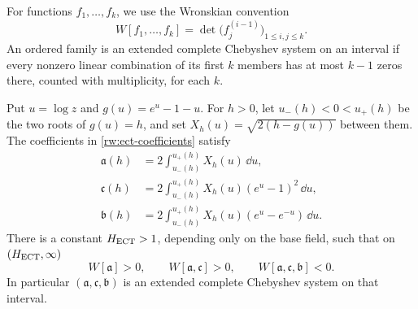 For functions $f_1,\ldots,f_k$, we use the Wronskian convention
\[
 W[f_1,\ldots,f_k]
   =\det\bigl(f_j^{(i-1)}\bigr)_{1\leq i,j\leq k}.
\]
An ordered family is an extended complete Chebyshev system on an
interval if every nonzero linear combination of its first $k$
members has at most $k-1$ zeros there, counted with multiplicity,
for each $k$.

\begin{proposition}
\label{rw:base-ect}
Put $u=\log z$ and $g(u)=e^u-1-u$. For $h>0$, let
$u_-(h)<0<u_+(h)$ be the two roots of $g(u)=h$, and set
$X_h(u)=\sqrt{2(h-g(u))}$ between them. The coefficients in
\eqref{rw:ect-coefficients} satisfy
\begin{equation}\label{rw:ect-integrals}
 \begin{aligned}
 \mathfrak a(h)&=2\int_{u_-(h)}^{u_+(h)}X_h(u)\,\dd u,\\
 \mathfrak c(h)&=2\int_{u_-(h)}^{u_+(h)}X_h(u)(e^u-1)^2\,\dd u,\\
 \mathfrak b(h)&=2\int_{u_-(h)}^{u_+(h)}X_h(u)(e^u-e^{-u})\,\dd u.
 \end{aligned}
\end{equation}
There is a constant $H_{\rm ECT}>1$, depending only on the base field,
such that on $(H_{\rm ECT},\infty)$
\begin{equation}\label{rw:ect-wronskian-signs}
 W[\mathfrak a]>0,\qquad
 W[\mathfrak a,\mathfrak c]>0,\qquad
 W[\mathfrak a,\mathfrak c,\mathfrak b]<0.
\end{equation}
In particular $(\mathfrak a,\mathfrak c,\mathfrak b)$ is an extended
complete Chebyshev system on that interval.
\end{proposition}

